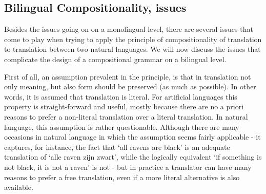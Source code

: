 \subsection{Bilingual Compositionality, issues}
\label{subsec:bilingual_problems}

Besides the issues going on on a monolingual level, there are several issues that come to play when trying to apply the principle of compositionality of translation to translation between two natural languages. We will now discuss the issues that complicate the design of a compositional grammar on a bilingual level.

First of all, an assumption prevalent in the principle, is that in translation not only meaning, but also form should be preserved (as much as possible). In other words, it is assumed that translation is literal. For artificial languages this property is straight-forward and useful, mostly because there are no a priori reasons to prefer a non-literal translation over a literal translation. In natural language, this assumption is rather questionable. Although there are many occasions in natural language in which the assumption seems fairly applicable - it captures, for instance, the fact that `all ravens are black' is an adequate translation of `alle raven zijn zwart', while the logically equivalent `if something is not black, it is not a raven' is not \citep{landsbergen1989power} - but in practice a translator can have many reasons to prefer a free translation, even if a more literal alternative is also available. 

